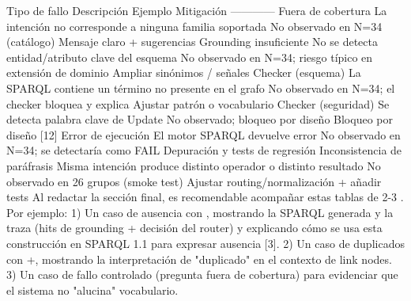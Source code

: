 {}\markdownRendererInterblockSeparator
{}\markdownRendererPipe{} Tipo de fallo \markdownRendererPipe{} Descripción \markdownRendererPipe{} Ejemplo \markdownRendererPipe{} Mitigación \markdownRendererPipe{} \markdownRendererPipe{}---\markdownRendererPipe{}---\markdownRendererPipe{}---\markdownRendererPipe{}---\markdownRendererPipe{} \markdownRendererPipe{} Fuera de cobertura \markdownRendererPipe{} La intención no corresponde a ninguna familia soportada \markdownRendererPipe{} No observado en N=34 (catálogo) \markdownRendererPipe{} Mensaje claro + sugerencias \markdownRendererPipe{} \markdownRendererPipe{} Grounding insuficiente \markdownRendererPipe{} No se detecta entidad/atributo clave del esquema \markdownRendererPipe{} No observado en N=34; riesgo típico en extensión de dominio \markdownRendererPipe{} Ampliar sinónimos / señales \markdownRendererPipe{} \markdownRendererPipe{} Checker (esquema) \markdownRendererPipe{} La SPARQL contiene un término no presente en el grafo \markdownRendererPipe{} No observado en N=34; el checker bloquea y explica \markdownRendererPipe{} Ajustar patrón o vocabulario \markdownRendererPipe{} \markdownRendererPipe{} Checker (seguridad) \markdownRendererPipe{} Se detecta palabra clave de Update \markdownRendererPipe{} No observado; bloqueo por diseño \markdownRendererPipe{} Bloqueo por diseño [12] \markdownRendererPipe{} \markdownRendererPipe{} Error de ejecución \markdownRendererPipe{} El motor SPARQL devuelve error \markdownRendererPipe{} No observado en N=34; se detectaría como FAIL \markdownRendererPipe{} Depuración y tests de regresión \markdownRendererPipe{} \markdownRendererPipe{} Inconsistencia de paráfrasis \markdownRendererPipe{} Misma intención produce distinto operador o distinto resultado \markdownRendererPipe{} No observado en 26 grupos (smoke test) \markdownRendererPipe{} Ajustar routing/normalización + añadir tests \markdownRendererPipe{}\markdownRendererInterblockSeparator
{}Al redactar la sección final, es recomendable acompañar estas tablas de 2-3 . Por ejemplo:\markdownRendererInterblockSeparator
{}1) Un caso de ausencia con , mostrando la SPARQL generada y la traza (hits de grounding + decisión del router) y explicando cómo se usa esta construcción en SPARQL 1.1 para expresar ausencia [3]. 2) Un caso de duplicados con +, mostrando la interpretación de "duplicado" en el contexto de link nodes. 3) Un caso de fallo controlado (pregunta fuera de cobertura) para evidenciar que el sistema no "alucina" vocabulario.\markdownRendererInterblockSeparator

